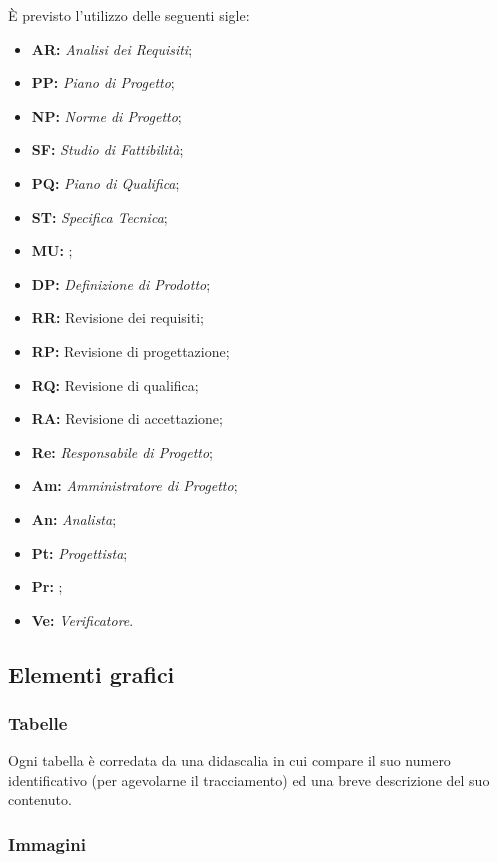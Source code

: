 \documentclass[../NormediProgetto.tex]{subfiles}
\begin{document}
È previsto l’utilizzo delle seguenti sigle: 

\begin{itemize}
    \item{\textbf{AR:}} \textit{Analisi dei Requisiti};
    \item{\textbf{PP:}} \textit{Piano di Progetto};
    \item{\textbf{NP:}} \textit{Norme di Progetto};
    \item{\textbf{SF:}} \textit{Studio di Fattibilità};
    \item{\textbf{PQ:}} \textit{Piano di Qualifica};
    \item{\textbf{ST:}} \textit{Specifica Tecnica};
    \item{\textbf{MU:}} ;
    \item{\textbf{DP:}} \textit{Definizione di Prodotto};
    \item{\textbf{RR:}} Revisione dei requisiti;
    \item{\textbf{RP:}} Revisione di progettazione;
    \item{\textbf{RQ:}} Revisione di qualifica;
    \item{\textbf{RA:}} Revisione di accettazione;
    \item{\textbf{Re:}} \textit{Responsabile di Progetto};
    \item{\textbf{Am:}} \textit{Amministratore di Progetto};
    \item{\textbf{An:}} \textit{Analista};
    \item{\textbf{Pt:}} \textit{Progettista};
    \item{\textbf{Pr:}} ;
    \item{\textbf{Ve:}} \textit{Verificatore}.
\end{itemize}

\subsection{Elementi grafici}

\subsubsection{Tabelle}

Ogni tabella è corredata da una didascalia in cui compare il suo numero identificativo (per agevolarne il tracciamento) ed una breve descrizione del suo contenuto.

\subsubsection{Immagini}
\end{document}
